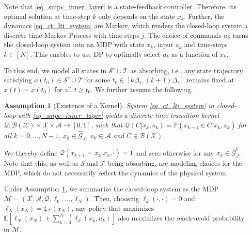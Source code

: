 \documentclass{IEEEtran}
\newtheorem{proposition}[theorem]{Proposition}
\newtheorem{assumption}{Assumption}
\begin{document}
Note that \eqref{eq_smpc_inner_layer} is a state-feedback controller. Therefore, its optimal solution at time-step $k$ only depends on the state $x_k$. Further, the dynamics \eqref{eq_ct_lti_system} are Markov, which renders the closed-loop system a discrete time Markov Process with time-steps $j$. The choice of commands $a_k$ turns the closed-loop system into an MDP with state $x_k$, input $a_k$ and time-steps $k\in[N]$. This enables to use DP to optimally select $a_k$ as a function of $x_k$. 
    
To this end, we model all states in $\mathcal{S}^c\cup \mathcal{T}$ as absorbing, i.e., any state trajectory satisfying $x(t_0)\in\mathcal{S}^c\cup \mathcal{T}$ for some $t_0\in[k\Delta_t,(k+1)\Delta_t]$ remains fixed at $x(t)=x(t_0)$ for all $t\geq t_0$. We further assume the following.
\begin{assumption}[Existence of a Kernel]\label{ass_existence_of_kernel}
    System \eqref{eq_ct_lti_system} in closed-loop with \ref{eq_smpc_inner_layer} yields a discrete time transition kernel $\mathcal{Q}:\mathcal{B}(\mathcal{X})\times \mathcal{X}\times\mathcal{A}\rightarrow[0,1]$, such that $\mathcal{Q}(C|{x}_k,a_k) = \mathbb{P}({x}_{k+1}\in C|{x}_k,a_k)$ for all $k=0,\dots,N-1$, ${x}_k\in\hat{\mathcal{G}}_J$, $a_k\in\mathcal{A}$ and $C\in\mathcal{B}({\mathcal{X}})$. 
\end{assumption}
We thereby define $\mathcal{Q}(x_{k+1}=x_k|{x}_k,\cdot)=1$ and zero otherwise for any $x_k\in\hat{\mathcal{G}}_J^c$. Note that this, as well as $\mathcal{S}$ and $\mathcal{T}$ being absorbing, are modeling choices for the MDP, which do not necessarily reflect the dynamics of the physical system. 

Under Assumption \ref{ass_existence_of_kernel}, we summarize the closed-loop system as the MDP $\mathcal{M}=(\mathcal{X} ,\mathcal{A},\mathcal{Q},\ell_0,\dots,\ell_N)$. 
Then, choosing $\ell_k(\cdot,\cdot)=0$ and $\ell_N(x_N)=\mathds{1}_{\mathcal{T}}(x_N)$, any policy that maximizes $\mathbb{E}[\ell_N({x}_N)+\sum_{k=0}^{N-1}\ell_k({x}_k,u_k)]$ also maximizes the reach-avoid probability in $\mathcal{M}$. 
\end{document}
